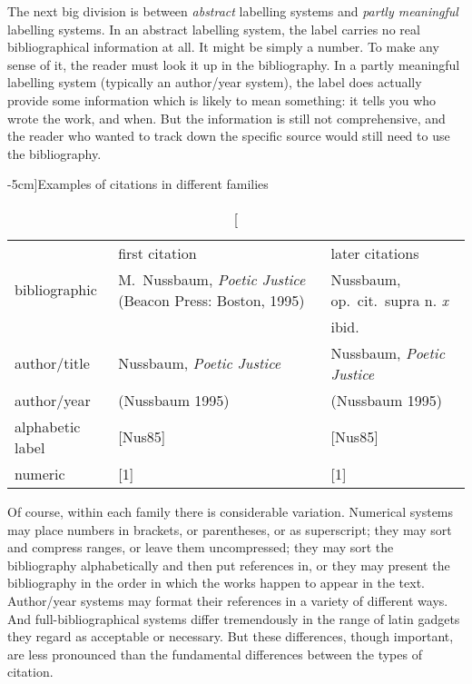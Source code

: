 The next big division is between \emph{abstract} labelling systems and
\emph{partly meaningful} labelling systems. In an abstract labelling
system, the label carries no real bibliographical information at
all. It might be simply a number. To make any sense of it, the reader
must look it up in the bibliography. In a partly meaningful labelling
system (typically an author/year system), the label does actually
provide some information which is likely to mean something: it tells
you who wrote the work, and when. But the information is still not
comprehensive, and the reader who wanted to track down the specific
source would still need to use the bibliography.

\begin{table*}[tbh]
\caption[][-5cm]{Examples of citations in different families}
\begin{tabular}{lp{6cm}p{6cm}}
\toprule
& \textsf{first citation} & \textsf{later citations} \\
\cmidrule(lr){2-2}\cmidrule(lr){3-3}
\textsf{bibliographic} & M.\ Nussbaum, \emph{Poetic Justice} (Beacon
Press: Boston, 1995) & Nussbaum, op.\ cit.\ supra n. \emph{x}\\
& & ibid. \\
\textsf{author/title} & Nussbaum, \emph{Poetic Justice} & Nussbaum,
\emph{Poetic Justice}\\
\textsf{author/year} & (Nussbaum 1995) & (Nussbaum 1995) \\
\textsf{alphabetic label} & [Nus85] & [Nus85]\\
\textsf{numeric} & [1] & [1] \\
\bottomrule
\end{tabular}
\end{table*}

Of course, within each family there is considerable
variation. Numerical systems may place numbers in brackets, or
parentheses, or as superscript; they may sort and compress ranges, or leave
them uncompressed; they may sort the bibliography alphabetically and
then put references in, or they may present the bibliography in the
order in which the works happen to appear in the
text. Author/year
systems may format their references in a variety of different
ways. And full-bibliographical systems differ tremendously in the
range of latin gadgets they regard as acceptable or necessary. But
these differences, though important, are less pronounced than the
fundamental differences between the types of citation.

